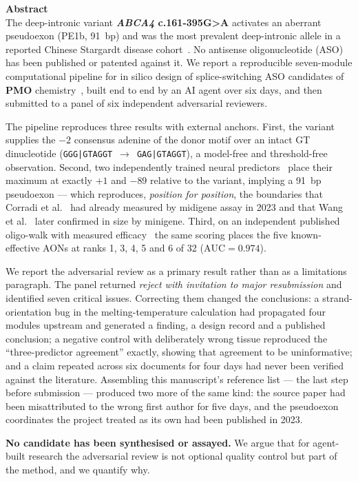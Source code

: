 \documentclass[11pt,a4paper]{article}
\begin{document}
\begin{center}
\begin{minipage}{0.92\linewidth}
{\bfseries\large Abstract}\\[0.4em]
\small
The deep-intronic variant \textbf{\emph{ABCA4} c.161-395G>A} activates an aberrant pseudoexon
(PE1b, 91~bp) and was the most prevalent deep-intronic allele in a reported Chinese Stargardt
disease cohort~\cite{wang2025}. No antisense oligonucleotide (ASO) has been published or patented
against it. We report a reproducible seven-module computational pipeline for in silico design of
splice-switching ASO candidates of \textbf{PMO} chemistry~\cite{summerton1997}, built end to end by
an AI agent over six days, and then submitted to a panel of six independent adversarial reviewers.

The pipeline reproduces three results with external anchors. First, the variant supplies the
$-2$ consensus adenine of the donor motif over an intact GT dinucleotide
(\texttt{GGG|GTAGGT}~$\rightarrow$~\texttt{GAG|GTAGGT}), a model-free and threshold-free
observation. Second, two independently trained neural predictors~\cite{jaganathan2019,zeng2022}
place their maximum at exactly $+1$ and $-89$ relative to the variant, implying a 91~bp pseudoexon
--- which reproduces, \emph{position for position}, the boundaries that Corradi et
al.~\cite{corradi2023} had already measured by midigene assay in 2023 and that Wang et
al.~\cite{wang2025} later confirmed in size by minigene. Third, on an independent published
oligo-walk with measured efficacy~\cite{kaltak2023} the same scoring places the five known-effective
AONs at ranks 1, 3, 4, 5 and 6 of 32 ($\mathrm{AUC}=0.974$).

We report the adversarial review as a primary result rather than as a limitations paragraph. The
panel returned \emph{reject with invitation to major resubmission} and identified seven critical
issues. Correcting them changed the conclusions: a strand-orientation bug in the melting-temperature
calculation had propagated four modules upstream and generated a finding, a design record and a
published conclusion; a negative control with deliberately wrong tissue reproduced the
``three-predictor agreement'' exactly, showing that agreement to be uninformative; and a claim
repeated across six documents for four days had never been verified against the literature.
Assembling this manuscript's reference list --- the last step before submission --- produced two
more of the same kind: the source paper had been misattributed to the wrong first author for five
days, and the pseudoexon coordinates the project treated as its own had been published in 2023.

\textbf{No candidate has been synthesised or assayed.} We argue that for agent-built research the
adversarial review is not optional quality control but part of the method, and we quantify why.
\end{minipage}
\end{center}
\end{document}
